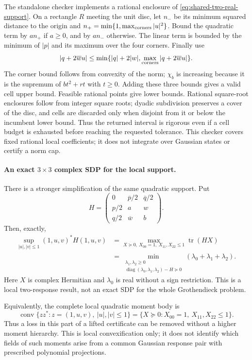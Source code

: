 The standalone checker  implements a
rational enclosure of \eqref{eq:shared-two-real-support}. On a rectangle $R$
meeting the unit disc, let $n_-$ be its minimum squared distance to the origin
and $n_+=\min\{1,\max_{\rm corners}|u|^2\}$. Bound the quadratic term by
$an_+$ if $a\ge0$, and by $an_-$ otherwise. The linear term is bounded by
the minimum of $|p|$ and its maximum over the four corners. Finally use
\[
 |q+2\overline w u|\le
 \min\{|q|+2|w|,\max_{\rm corners}|q+2\overline w u|\}.
\]
The corner bound follows from convexity of the norm; $\chi_b$ is increasing
because it is the supremum of $bt^2+rt$ with $t\ge0$. Adding these three
bounds gives a valid cell upper bound. Feasible rational points give lower
bounds. Rational square-root enclosures follow from integer square roots;
dyadic subdivision preserves a cover of the disc, and cells are discarded
only when disjoint from it or below the incumbent lower bound. Thus the
returned interval is rigorous even if a cell budget is exhausted before
reaching the requested tolerance. This checker covers fixed rational local
coefficients; it does not integrate over Gaussian states or certify a norm cap.

\paragraph{An exact $3\times3$ complex SDP for the local support.}
There is a stronger simplification of the same quadratic support. Put
\[
 H=\begin{pmatrix}
 0&\overline p/2&\overline q/2\\
 p/2&a&w\\q/2&\overline w&b
 \end{pmatrix}.
\]
Then, exactly,
\begin{align}
 \sup_{|u|,|v|\le1}(1,u,v)^*H(1,u,v)
 &=\max_{X\succeq0,\ X_{00}=1,\ X_{11},X_{22}\le1}
           \operatorname{tr}(HX)\label{eq:shared-exact-local-sdp}\\
 &=\min_{\substack{\lambda_1,\lambda_2\ge0\\
             \operatorname{diag}(\lambda_0,\lambda_1,\lambda_2)-H\succeq0}}
            (\lambda_0+\lambda_1+\lambda_2).\nonumber
\end{align}
Here $X$ is complex Hermitian and $\lambda_0$ is real without a sign
restriction. This is a local two-response result, not an exact SDP for the
whole Grothendieck problem.

Equivalently, the complete local quadratic moment body is
\[
 \boxed{\operatorname{conv}\{zz^*:z=(1,u,v),\ |u|,|v|\le1\}
       =\{X\succeq0:X_{00}=1,\ X_{11},X_{22}\le1\}.}
\]
Thus a loss in this part of a lifted certificate can be removed without a
higher moment hierarchy. This is local convexification only; it does not
identify which fields of such moments arise from a common Gaussian response
pair with prescribed polynomial projections.

